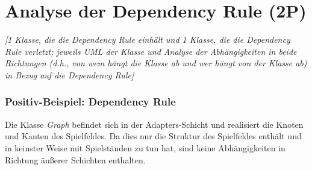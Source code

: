 \section{Analyse der Dependency Rule (2P)}
\emph{[1 Klasse, die die Dependency Rule einhält und 1 Klasse, die die Dependency Rule verletzt; jeweils
UML der Klasse und Analyse der Abhängigkeiten in beide Richtungen (d.h., von wem hängt die Klasse
ab und wer hängt von der Klasse ab) in Bezug auf die Dependency Rule]}

\subsubsection{Positiv-Beispiel: Dependency Rule}
\noindent Die Klasse \emph{Graph} befindet sich in der Adapters-Schicht und realisiert die Knoten und Kanten des Spielfeldes. Da dies nur die Struktur des Spielfeldes enthält und in keinster Weise mit Spielständen zu tun hat, sind keine Abhängigkeiten in Richtung äußerer Schichten enthalten.

